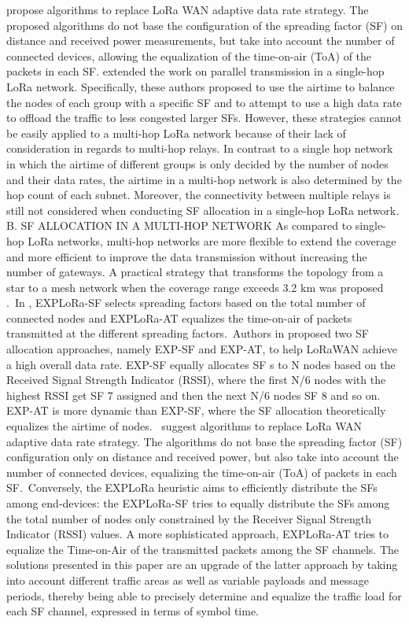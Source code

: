  \cite{cuomo_explora_2017}   \citet{cuomo_explora_2017} propose algorithms to replace LoRa WAN adaptive data rate strategy. The proposed algorithms do not base the configuration of the spreading factor (SF) on distance and received power measurements, but take into account the number of connected devices, allowing the equalization of the time-on-air (ToA) of the packets in each SF.\citet{cuomo_explora_2017} extended the work on parallel transmission in a single-hop LoRa network. Specifically, these authors proposed to use the airtime to balance the nodes of each group with a specific SF and to attempt to use a high data rate to offload the traffic to less congested larger SFs. However, these strategies cannot be easily applied to a multi-hop LoRa network because of their lack of consideration in regards to multi-hop relays. In contrast to a single hop network in which the airtime of different groups is only decided by the number of nodes and their data rates, the airtime in a multi-hop network is also determined by the hop count of each subnet. Moreover, the connectivity between multiple relays is still not considered when conducting SF allocation in a single-hop LoRa network. B. SF ALLOCATION IN A MULTI-HOP NETWORK As compared to single-hop LoRa networks, multi-hop networks are more flexible to extend the coverage and more efficient to improve the data transmission without increasing the number of gateways. A practical strategy that transforms the topology from a star to a mesh network when the coverage range exceeds 3.2 km was proposed \cite{ochoa_evaluating_2017}.~In \cite{cuomo_explora_2017}, EXPLoRa-SF selects spreading factors based on the total number of connected nodes and EXPLoRa-AT equalizes the time-on-air of packets transmitted at the different spreading factors.~Authors in \cite{cuomo_explora_2017} proposed two SF allocation approaches, namely EXP-SF and EXP-AT, to help LoRaWAN achieve a high overall data rate. EXP-SF equally allocates SF s to N nodes based on the Received Signal Strength Indicator (RSSI), where the first N/6 nodes with the highest RSSI get SF 7 assigned and then the next N/6 nodes SF 8 and so on. EXP-AT is more dynamic than EXP-SF, where the SF allocation theoretically equalizes the airtime of nodes.~\citet{cuomo_explora_2017} suggest algorithms to replace LoRa WAN adaptive data rate strategy. The algorithms do not base the spreading factor (SF) configuration only on distance and received power, but also take into account the number of connected devices, equalizing the time-on-air (ToA) of packets in each SF.~Conversely, the EXPLoRa heuristic \cite{cuomo_explora_2017} aims to efficiently distribute the SFs among end-devices: the EXPLoRa-SF tries to equally distribute the SFs among the total number of nodes only constrained by the Receiver Signal Strength Indicator (RSSI) values. A more sophisticated approach, EXPLoRa-AT tries to equalize the Time-on-Air of the transmitted packets among the SF channels. The solutions presented in this paper are an upgrade of the latter approach by taking into account different traffic areas as well as variable payloads and message periods, thereby being able to precisely determine and equalize the traffic load for each SF channel, expressed in terms of symbol time.~~   \newline 

